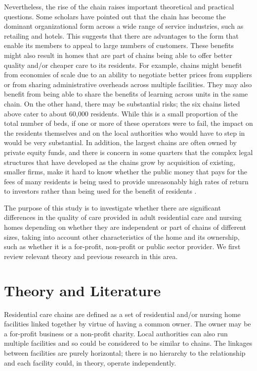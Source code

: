 \documentclass[a4paper,11pt,titlepage,british]{article}
\begin{document}
Nevertheless, the rise of the chain raises important theoretical and practical questions.  Some scholars have pointed out that the chain has become the dominant organizational form across a wide range of service industries, such as retailing and hotels.  This suggests that there are advantages to the form that enable its members to appeal to large numbers of customers.  These benefits might also result in homes that are part of chains being able to offer better quality and/or cheaper care to its residents.  For example, chains might benefit from economies of scale due to an ability to negotiate better prices from suppliers or from sharing administrative overheads across multiple facilities.  They may also benefit from being able to share the benefits of learning across units in the same chain.  On the other hand, there may be substantial risks; the six chains listed above cater to about 60,000 residents.  While this is a small proportion of the total number of beds, if one or more of these operators were to fail, the impact on the residents themselves and on the local authorities who would have to step in would be very substantial.  In addition, the largest chains are often owned by private equity funds, and there is concern in some quarters that the complex legal structures that have developed as the chains grow by acquisition of existing, smaller firms, make it hard to know whether the public money that pays for the fees of many residents is being used to provide unreasonably high rates of return to investors rather than being used for the benefit of residents \parencite{Burns2016}.

The purpose of this study is to investigate whether there are significant differences in the quality of care provided in adult residential care and nursing homes depending on whether they are independent or part of chains of different sizes, taking into account other characteristics of the home and its ownership, such as whether it is a for-profit, non-profit or public sector provider.  We first review relevant theory and previous research in this area.

\section{Theory and Literature}

Residential care chains are defined as a set of residential and/or nursing home facilities linked together by virtue of having a common owner.  The owner may be a for-profit business or a non-profit charity.  Local authorities can also run multiple facilities and so could be considered to be similar to chains.  The linkages between facilities are purely horizontal; there is no hierarchy to the relationship and each facility could, in theory, operate independently.
\end{document}
